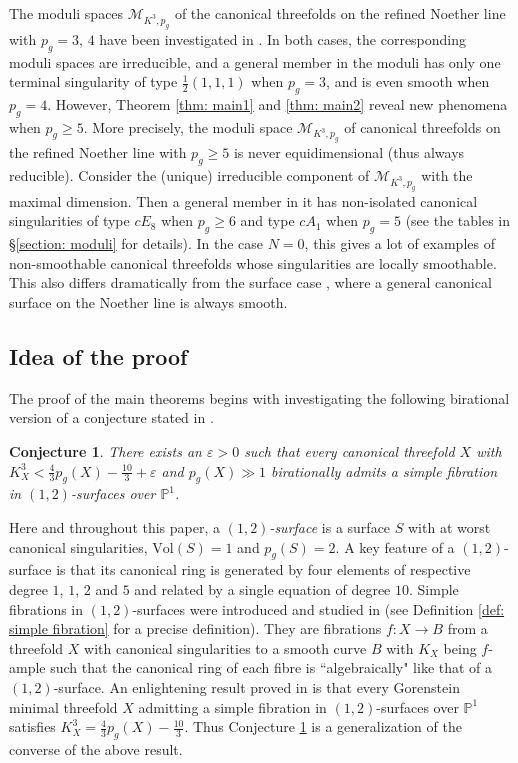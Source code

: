 \documentclass[a4paper,11pt]{amsart}
\newcommand{\M}{\ensuremath{\mathcal{M}}}
\newcommand{\PP}{\ensuremath{\mathbb{P}}}
\newtheorem{conj}[thm]{Conjecture}
\theoremstyle{definition}
\theoremstyle{remark}
\numberwithin{equation}{section}
\begin{document}
The moduli spaces $\M_{K^3,p_g}$ of the canonical threefolds on the refined Noether line with $p_g = 3$, $4$ have been investigated in \cite{CHJ}. In both cases, the corresponding moduli spaces are irreducible, and a general member in the moduli has only one terminal singularity of type $\frac{1}{2}(1,1,1)$ when $p_g = 3$, and is even smooth when $p_g = 4$. However, Theorem \ref{thm: main1} and \ref{thm: main2} reveal new phenomena when $p_g \ge 5$. More precisely, the moduli space $\M_{K^3,p_g}$ of canonical threefolds on the refined Noether line with $p_g \ge 5$ is never equidimensional (thus always reducible). Consider the (unique) irreducible component of $\M_{K^3,p_g}$ with the maximal dimension. Then a general member in it has non-isolated canonical singularities of type $cE_8$ when $p_g \ge 6$ and type $cA_1$ when $p_g = 5$ (see the tables in \S \ref{section: moduli} for details). In the case $N=0$, this gives a lot of examples of non-smoothable canonical threefolds whose singularities are locally smoothable. This also differs dramatically from the surface case \cite{Horikawa1}, where a general canonical surface on the Noether line is always smooth.

\subsection{Idea of the proof}

The proof of the main theorems begins with investigating the following birational version of a conjecture stated in \cite[Introduction]{CP}.

\begin{conj} \label{conj}
    There exists an $\varepsilon > 0$ such that every canonical threefold $X$ with $K_X^3 < \frac{4}{3} p_g(X) - \frac{10}{3} + \varepsilon$ and $p_g(X) \gg 1$ birationally admits a simple fibration in $(1, 2)$-surfaces over $\PP^1$.
\end{conj}

Here and throughout this paper, a \emph{$(1, 2)$-surface} is a surface $S$ with at worst canonical singularities, $\mathrm{Vol}(S) = 1$ and $p_g(S) = 2$. A key feature of a $(1, 2)$-surface is that its canonical ring is generated by four elements of respective degree $1$, $1$, $2$ and $5$ and related by a single equation of degree $10$. Simple fibrations in $(1,2)$-surfaces were introduced and studied in \cite{CP} (see Definition \ref{def: simple fibration} for a precise definition). They are fibrations $f \colon X \to B$ from a threefold $X$ with canonical singularities to a smooth curve $B$ with $K_X$ being $f$-ample such that the canonical ring of each fibre is ``algebraically" like that of a $(1, 2)$-surface. An enlightening result proved in \cite{CP} is that every Gorenstein minimal threefold $X$ admitting a simple fibration in $(1, 2)$-surfaces over $\PP^1$ satisfies $K_X^3 = \frac{4}{3}p_g(X) - \frac{10}{3}$. Thus Conjecture \ref{conj} is a generalization of the converse of the above result. 
\end{document}
